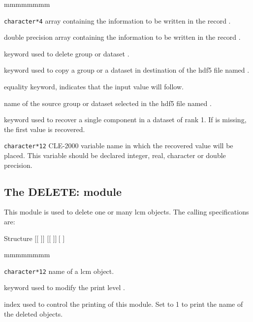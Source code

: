 \begin{ListeDeDescription}{mmmmmmmm}
\item[\dusa{hvalc}] {\tt character*4} array containing the information to be written in the record .

\item[\dusa{dvalc}] double precision array containing the information to be written in the record .

\item[\moc{DELE}] keyword used to delete group or dataset .

\item[\moc{COPY}] keyword used to copy a group or a dataset in destination  of the {\sc hdf5} file named .

\item[\moc{=}] equality keyword, indicates that the input value will follow.

\item[\dusa{BLOCK2}] name of the source group or dataset selected in the {\sc hdf5} file named .

\item[\moc{GREP}] keyword used to recover a single component in a dataset of rank 1. If  is missing, the first value is recovered.

\item[\dusa{value}] {\tt character*12} CLE-2000 variable name in which the recovered value will be placed. This variable should be
declared integer, real, character or double precision.

\end{ListeDeDescription}

\clearpage

\subsection{The DELETE: module}\label{sect:DELETEData}

This module is used to delete one or many {\sc lcm} objects. The calling
specifications are:

\begin{DataStructure}{Structure }
$[[$  $]]$ \moc{:=}  $[[$  $]]~[$ \moc{::}   $]$ \moc{;}
\end{DataStructure}

\begin{ListeDeDescription}{mmmmmmmm}

\item[\dusa{NAME1}] {\tt character*12} name of a {\sc lcm} object.

\item[\moc{EDIT}] keyword used to modify the print level .

\item[\dusa{iprint}] index used to control the printing of this module. Set to 1 to
print the name of the deleted objects.

\end{ListeDeDescription}

